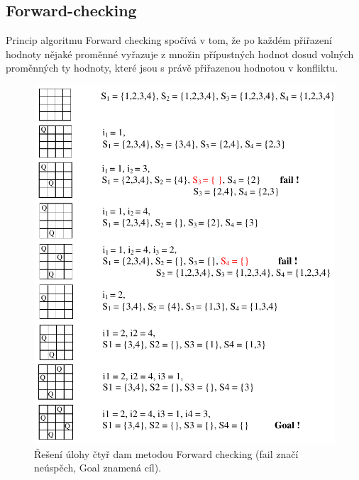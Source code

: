 \subsection{Forward-checking}

\begin{compactitem}
    \item Princip algoritmu Forward checking spočívá v tom, že po každém přiřazení hodnoty nějaké proměnné vyřazuje z množin přípustných hodnot dosud volných proměnných ty hodnoty, které jsou s právě přiřazenou hodnotou v konfliktu.


    \begin{figure}[H]
        \centering
        \includegraphics[width=1\linewidth]{forwardcheck_csp.pdf}
        \caption{Řešení úlohy čtyř dam metodou Forward checking (fail značí neúspěch, Goal znamená cíl).}
    \end{figure}
\end{compactitem}
